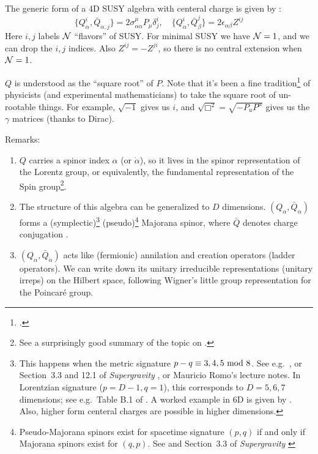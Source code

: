 \documentclass[a4paper
	,10pt
]{article}
\begin{document}
	The generic form of a 4D SUSY algebra with centeral charge is given by \cite{Wess:1992cp}:
	\begin{equation}
		\{ Q^i_\alpha, \bar{Q}_{\dot{\alpha},j} \}
		= 2\sigma^\mu_{\alpha\dot{\alpha}} P_\mu
			\delta^i_j,
	\quad
		\{ Q^i_\alpha, \bar{Q}^j_{\beta} \}
		= 2\epsilon_{\alpha\beta} Z^{ij}
	\end{equation}
	Here $i,j$ labels $\mathcal{N}$ ``flavors'' of SUSY. For minimal SUSY we have $\mathcal{N} = 1$, and we can drop the $i,j$ indices. Also $Z^{ij} = -Z^{ji}$, so there is no central extension when $\mathcal{N} = 1$. 
	
	$Q$ is understood as the ``square root'' of $P$. 
	Note that it's been a fine tradition\footnote{
		.
	} of physicists (and experimental mathematicians) to take the square root of un-rootable things. For example, $\sqrt{-1}$ gives us $i$, and $\sqrt{\Box^2} = \sqrt{-P_u P^\mu}$ gives us the $\gamma$ matrices (thanks to Dirac). 
	
	Remarks:
	\begin{enumerate}
	\item $Q$ carries a spinor index $\alpha$ (or $\dot{\alpha}$), so it lives in the spinor representation of the Lorentz group, or equivalently, the fundamental representation of the Spin group\footnote{
		See a surprisingly good summary of the topic on . 
	}. 
	
	\item The structure of this algebra can be generalized to $D$ dimensions. $(Q_\alpha, \bar{Q}_{\dot{\alpha}})$ forms a \mbox{(symplectic)}\footnote{
		This happens when the metric signature $p - q \equiv 3,4,5\,\operatorname{mod}\,8$. See e.g.~\textcite{figueroa2015majorana}, or Section~3.3 and 12.1 of \textit{Supergravity} \cite{Freedman:2012zz}, or Mauricio Romo's lecture notes. In Lorentzian signature ($p = D-1, q = 1$), this corresponds to $D = 5,6,7$ dimensions; see e.g.~Table B.1 of \textcite{Polchinski:1998rq}. A worked example in 6D is given by \cite{Gustavsson:2001uw}. Also, higher form centeral charges are possible in higher dimensions. 
	} (pseudo)\footnote{
		Pseudo-Majorana spinors exist for spacetime signature $(p,q)$ if and only if Majorana spinors exist for $(q,p)$. See \textcite{figueroa2015majorana} and Section~3.3 of \textit{Supergravity} \cite{Freedman:2012zz}
	} Majorana spinor, where $\bar{Q}$ denotes charge conjugation \cite{Freedman:2012zz}. 
	
	\item $(Q_\alpha, \bar{Q}_{\dot{\alpha}})$ acts like (fermionic) annilation and creation operators (ladder operators). We can write down its unitary irreducible representations (unitary irreps) on the Hilbert space, following Wigner's little group representation for the Poincar\'e group. 
	\end{enumerate}
\end{document}
